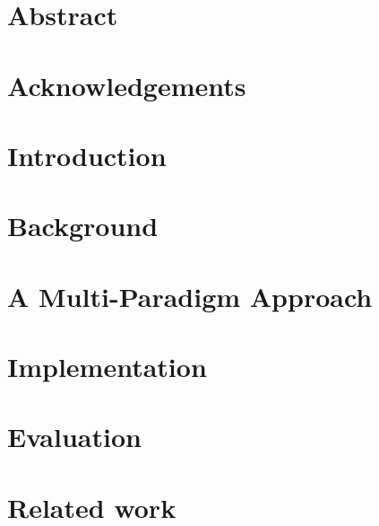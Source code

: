 \documentclass[11pt]{article}
\begin{document}

\clearpage

\onehalfspacing{}

\section*{Abstract}
\clearpage

\section*{Acknowledgements}
\clearpage

\tableofcontents
\clearpage

\section{Introduction}
\label{sec:intro}


\section{Background}
\label{sec:background}


\section{A Multi-Paradigm Approach}
\label{sec:design}


\section{Implementation}
\label{sec:implementation}


\section{Evaluation}




\section{Related work}
\label{sec:related}

\end{document}
